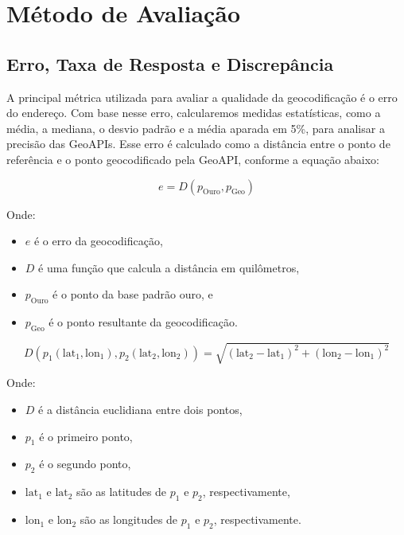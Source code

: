 \section{Método de Avaliação}
\label{metricasErro}

\subsection{Erro, Taxa de Resposta e Discrepância}

A principal métrica utilizada para avaliar a qualidade da geocodificação é o erro do endereço. Com base nesse erro, calcularemos medidas estatísticas, como a média, a mediana, o desvio padrão e a média aparada em 5\%, para analisar a precisão das GeoAPIs. Esse erro é calculado como a distância entre o ponto de referência e o ponto geocodificado pela GeoAPI, conforme a equação abaixo:

\begin{equation}
e = D(p_{\text{Ouro}}, p_{\text{Geo}})
\end{equation}

Onde:
\begin{itemize}
\item $e$ é o erro da geocodificação,
\item $D$ é uma função que calcula a distância em quilômetros,
\item $p_{\text{Ouro}}$ é o ponto da base padrão ouro, e
\item $p_{\text{Geo}}$ é o ponto resultante da geocodificação.
\end{itemize}

\begin{equation}
D( p_1(\text{lat}_1, \text{lon}_1), p_2(\text{lat}_2, \text{lon}_2) ) = \sqrt{{(\text{lat}_2 - \text{lat}_1)^2 + (\text{lon}_2 - \text{lon}_1)^2}}
\label{eq:distEuclidian}
\end{equation}

Onde:
\begin{itemize}
    \item $D$ é a distância euclidiana entre dois pontos,
    \item $p_1$ é o primeiro ponto,
    \item $p_2$ é o segundo ponto,
    \item $\text{lat}_1$ e $\text{lat}_2$ são as latitudes de $p_1$ e $p_2$, respectivamente,
    \item $\text{lon}_1$ e $\text{lon}_2$ são as longitudes de $p_1$ e $p_2$, respectivamente.
\end{itemize}

